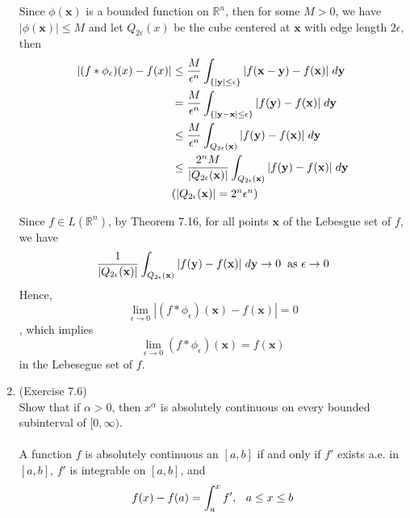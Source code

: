 \documentclass[a4paper,11pt]{article}
\begin{document}
\begin{enumerate}
 		Since $\phi(\mathbf{x})$ is a bounded function on $\mathbb{R}^n$, then for some $M > 0$, we have $|\phi(\mathbf{x})| \leq M$ and let $Q_{2\epsilon}(x)$ be the cube centered at $\mathbf{x}$ with edge length $2 \epsilon$, then
 		$$\begin{aligned}
 		|(f*\phi_\epsilon) (x) - f(x)|
 		&\leq \frac{M}{\epsilon^n} \int_{\{|\mathbf{y}| \leq \epsilon\}} |f(\mathbf{x} - \mathbf{y}) - f(\mathbf{x})| \hspace{0.1cm} d \mathbf{y}\\
 		&= \frac{M}{\epsilon^n} \int_{\{ |\mathbf{y} - \mathbf{x}| \leq \epsilon \}} |f(\mathbf{y}) - f(\mathbf{x})| \hspace{0.1cm} d\mathbf{y}\\
 		&\leq \frac{M}{\epsilon^n} \int_{Q_{2\epsilon} (\mathbf{x})} |f(\mathbf{y}) - f(\mathbf{x})| \hspace{0.1cm} d\mathbf{y}\\
 		&\leq \frac{2^n M}{|Q_{2 \epsilon} (\mathbf{x})|} \int_{Q_{2 \epsilon} (\mathbf{x})} |f(\mathbf{y}) - f(\mathbf{x})| \hspace{0.1cm} d\mathbf{y}\\
 		&\mbox{($|Q_{2\epsilon}(\mathbf{x})| = 2^n \epsilon^n$)}
 		\end{aligned}$$

 		Since $f \in L(\mathbb{R}^n)$, by Theorem 7.16, for all points $\mathbf{x}$ of the Lebesgue set of $f$, we have
 		$$\frac{1}{|Q_{2\epsilon} (\mathbf{x})|} \int_{Q_{2\epsilon}(\mathbf{x})} |f(\mathbf{y}) - f(\mathbf{x})| \hspace{0.1cm} d \mathbf{y} \to 0 \hspace{0.2cm} \mbox{as } \epsilon \to 0$$
 		Hence,
 		$$\underset{\epsilon \to 0}{\lim} |(f*\phi_\epsilon)(\mathbf{x}) - f(\mathbf{x})| = 0$$, which implies
 		$$\underset{\epsilon \to 0}{\lim} (f*\phi_\epsilon) (\mathbf{x}) = f(\mathbf{x})$$
 		in the Lebesegue set of $f$.\\







 	\item (Exercise 7.6)\\
 		Show that if $\alpha > 0$, then $x^\alpha$ is absolutely continuous on every bounded subinterval of $[0,\infty)$.\\

 		\\
 		A function $f$ is absolutely continuous an $[a,b]$ if and only if $f'$ exists a.e. in $[a,b]$, $f'$ is integrable on $[a,b]$, and
 		$$f(x) - f(a) = \int_a^x f' \mbox{, } \hspace{0.2cm} a \leq x \leq b$$
 	

\end{enumerate}
\end{document}
